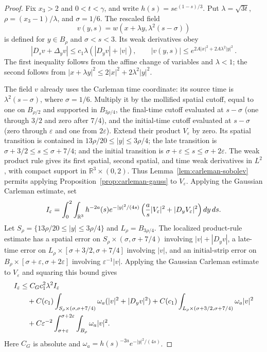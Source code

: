 \documentclass[11pt,letterpaper]{article}
\numberwithin{equation}{section}
\theoremstyle{plain}
\theoremstyle{definition}
\theoremstyle{remark}
\begin{document}
\begin{proof}
Fix $x_3>2$ and $0<t<\gamma$, and write
$h(s)=s e^{(1-s)/3}$. Put $\lambda=\sqrt{3t}$,
$\rho=(x_3-1)/\lambda$, and $\sigma=1/6$. The rescaled
field
\[
  v(y,s)=w(x+\lambda y,\lambda^2(s-\sigma))
\]
is defined for $y\in B_\rho$ and $\sigma<s<3$. Its weak derivatives obey
\[
  |D_sv+\Delta_yv|\le c_1\lambda(|D_yv|+|v|),\qquad
  |v(y,s)|\le e^{2A|x|^2+2A\lambda^2|y|^2}\,.
\]
The first inequality follows from the affine change of variables and
$\lambda<1$; the second follows from
$|x+\lambda y|^2\le2|x|^2+2\lambda^2|y|^2$.

The field $v$ already uses the Carleman time coordinate: its source time is
$\lambda^2(s-\sigma)$, where $\sigma=1/6$. Multiply it by the mollified
spatial cutoff, equal to one on $B_{\rho/2}$ and supported in
$B_{3\rho/4}$, the final-time cutoff evaluated at $s-\sigma$ (one through
$3/2$ and zero after $7/4$), and the initial-time cutoff evaluated at
$s-\sigma$ (zero through $\varepsilon$ and one from $2\varepsilon$).
Extend their product $V_\varepsilon$ by zero. Its spatial transition is
contained in $13\rho/20\leq|y|\leq3\rho/4$; the late transition is
$\sigma+3/2\leq s\leq\sigma+7/4$; and the initial transition is
$\sigma+\varepsilon\leq s\leq\sigma+2\varepsilon$. The weak product rule
gives its first spatial, second spatial, and time weak derivatives in
$L^2$, with compact support in $\mathbb R^3\times(0,2)$. Thus
Lemma~\ref{lem:carleman-sobolev} permits applying
Proposition~\ref{prop:carleman-gauss} to $V_\varepsilon$. Applying the
Gaussian Carleman estimate, set
\[
 I_\varepsilon=\int_0^2\int_{\mathbb{R}^3}h^{-2a}(s)e^{-|y|^2/(4s)}
 \left(\frac{a}{s}|V_\varepsilon|^2+|D_yV_\varepsilon|^2\right)dy\,ds.
\]
Let $S_\rho=\{13\rho/20\leq|y|\leq3\rho/4\}$ and
$L_\rho=B_{3\rho/4}$. The localized product-rule estimate has a
spatial error on $S_\rho\times(\sigma,\sigma+7/4)$ involving
$|v|+|D_yv|$, a late-time error on
$L_\rho\times[\sigma+3/2,\sigma+7/4]$ involving $|v|$, and an
initial-strip error on
$B_\rho\times[\sigma+\varepsilon,\sigma+2\varepsilon]$ involving
$\varepsilon^{-1}|v|$. Applying the Gaussian Carleman estimate to
$V_\varepsilon$ and squaring this bound gives
\begin{align}
 I_\varepsilon
 &\leq C_Gc_1^2\lambda^2 I_\varepsilon\notag\\
 &\quad+C(c_1)\int_{S_\rho\times(\sigma,\sigma+7/4)}
       \omega_a(|v|^2+|D_yv|^2)
   +C(c_1)\int_{L_\rho\times(\sigma+3/2,\sigma+7/4)}\omega_a|v|^2\notag\\
 &\quad+C\varepsilon^{-2}
       \int_{\sigma+\varepsilon}^{\sigma+2\varepsilon}
             \int_{B_\rho}\omega_a|v|^2.
\end{align}
Here $C_G$ is absolute and $\omega_a=h(s)^{-2a}e^{-|y|^2/(4s)}$.



\end{proof}
\end{document}
